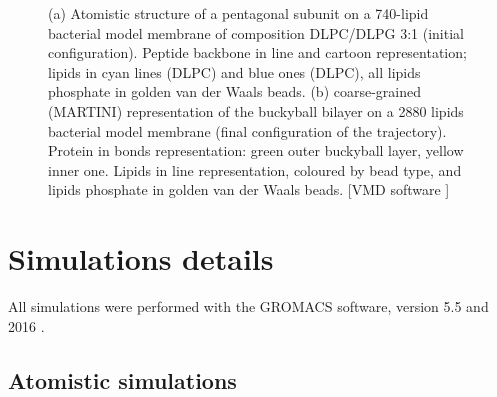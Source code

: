 \begin{figure}[t]
\centering
{}
\caption[Snapshots of multiscale simulations of capzip on model membranes]{(a) Atomistic structure of a pentagonal subunit on a 740-lipid bacterial model membrane of composition DLPC/DLPG 3:1 (initial configuration). Peptide backbone in line and cartoon representation; lipids in cyan lines (DLPC) and blue ones (DLPC), all lipids phosphate in golden van der Waals beads. (b) coarse-grained (MARTINI) representation of the buckyball bilayer on a 2880 lipids bacterial model membrane (final configuration of the trajectory). Protein in bonds representation: green outer buckyball layer, yellow inner one. Lipids in line representation, coloured by bead type, and lipids phosphate in golden van der Waals beads. [VMD software \citet{HUMP96}]}
\label{fig:pL6_vmd}
\end{figure}


\section{Simulations details} \label{sec:details}

All simulations were performed with the GROMACS software, version 5.5 and 2016 \citep{Berendsen1995,Abraham2015,gromacs_man}. 

\subsection{Atomistic simulations}
